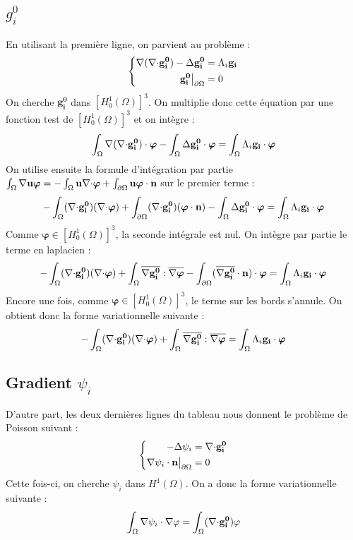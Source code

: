 \subsection{$g_i^0$}
En utilisant la première ligne, on parvient au problème :
\begin{equation}\label{gi0}
\left\{\begin{aligned}
{\nabla}({\nabla\cdot} \mathbf{g_i^0})-{\Delta} \mathbf{g_i^0} &= \Lambda_i\mathbf{g_i}\\
\mathbf{g_i^0}{\big\rvert_{\partial\Omega}} &= 0
\end{aligned}\right.
\end{equation}
On cherche $\mathbf{g_i^0}$ dans $[H^1_0(\Omega)]^3$. On multiplie donc cette équation par une fonction test de $[H^1_0(\Omega)]^3$ et on intègre :
\[ \int_\Omega {\nabla}({\nabla\cdot} \mathbf{g_i^0})\cdot\bm{\varphi} - \int_\Omega {\Delta} \mathbf{g_i^0}\cdot\bm{\varphi} = \int_\Omega \Lambda_i\mathbf{g_i}\cdot\bm{\varphi} \]
On utilise ensuite la formule d'intégration par partie $\int_\Omega {\nabla}{\mathbf{u}}\bm{\varphi} = -\int_\Omega \mathbf{u}{\nabla\cdot}\bm{\varphi} + \int_{\partial\Omega} \mathbf{u}\bm{\varphi}\cdot \mathbf{n}$ sur le premier terme :
\[ -\int_\Omega ({\nabla\cdot} \mathbf{g_i^0})({\nabla\cdot}\bm{\varphi}) + \int_{\partial\Omega} ({\nabla\cdot} \mathbf{g_i^0})(\bm{\varphi}\cdot \mathbf{n}) - \int_\Omega {\Delta} \mathbf{g_i^0}\cdot\bm{\varphi} = \int_\Omega \Lambda_i\mathbf{g_i}\cdot\bm{\varphi} \]
Comme $\bm{\varphi}\in [H^1_0(\Omega)]^3$, la seconde intégrale est nul. On intègre par partie le terme en laplacien :
\[ -\int_\Omega ({\nabla\cdot} \mathbf{g_i^0})({\nabla\cdot}\bm{\varphi}) + \int_\Omega \overline{{\nabla} \mathbf{g_i^0}}:\overline{{\nabla}\bm{\varphi}} - \int_{\partial\Omega} (\overline{{\nabla} \mathbf{g_i^0}}\cdot \mathbf{n})\cdot\bm{\varphi} = \int_\Omega \Lambda_i\mathbf{g_i}\cdot\bm{\varphi} \]
Encore une fois, comme $\bm{\varphi}\in [H^1_0(\Omega)]^3$, le terme sur les bords s'annule. On obtient donc la forme variationnelle suivante :
\begin{equation}\label{fvgi0}
-\int_\Omega ({\nabla\cdot} \mathbf{g_i^0})({\nabla\cdot}\bm{\varphi}) + \int_\Omega \overline{{\nabla} \mathbf{g_i^0}}:\overline{{\nabla}\bm{\varphi}} = \int_\Omega \Lambda_i\mathbf{g_i}\cdot\bm{\varphi}
\end{equation}

\subsection{Gradient $\psi_i$}
\label{multLagrange}

D'autre part, les deux dernières lignes du tableau nous donnent le problème de Poisson suivant :
\begin{equation}\label{psi}
\left\{\begin{aligned}
-{\Delta}\psi_i &= {\nabla\cdot} \mathbf{g_i^0}\\
{\nabla}\psi_i\cdot \mathbf{n}{\big\rvert_{\partial\Omega}} &= 0
\end{aligned}\right.
\end{equation}
Cette fois-ci, on cherche $\psi_i$ dans $H^1(\Omega)$. On a donc la forme variationnelle suivante :
\begin{equation}\label{fvpsi}
\int_\Omega {\nabla}\psi_i\cdot{\nabla}\varphi = \int_\Omega ({\nabla\cdot} \mathbf{g_i^0})\varphi
\end{equation}

